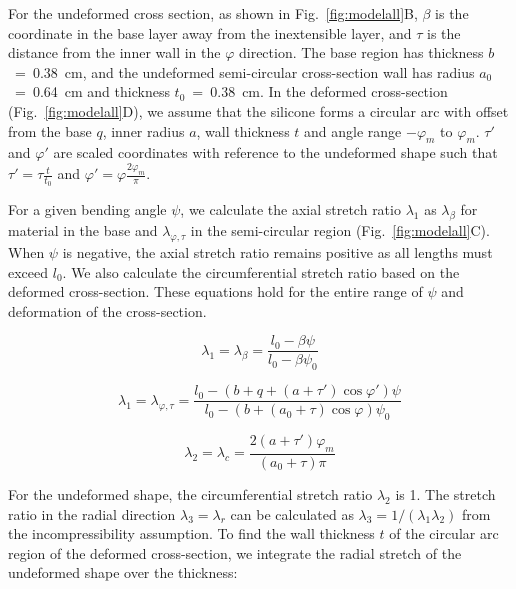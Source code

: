 For the undeformed cross section, as shown in Fig.~\ref{fig:modelall}B, $\beta$ is the coordinate in the base layer away from the inextensible layer, and $\tau$ is the distance from the inner wall in the $\varphi$ direction. The base region has thickness $b$~=~0.38~cm, and the undeformed semi-circular cross-section wall has radius $a_0$~=~0.64~cm and thickness $t_0$~=~0.38~cm. In the deformed cross-section (Fig.~\ref{fig:modelall}D), we assume that the silicone forms a circular arc with offset from the base $q$, inner radius $a$, wall thickness $t$ and angle range $-\varphi_m$ to $\varphi_m$. $\tau'$ and $\varphi'$ are scaled coordinates with reference to the undeformed shape such that $\tau'=\tau\frac{t}{t_0}$ and $\varphi'=\varphi\frac{2\varphi_m}{\pi}$.

For a given bending angle $\psi$, we calculate the axial stretch ratio $\lambda_1$ as $\lambda_{\beta}$ for material in the base and $\lambda_{\varphi,\tau}$ in the semi-circular region (Fig.~\ref{fig:modelall}C). When $\psi$ is negative, the axial stretch ratio remains positive as all lengths must exceed $l_0$. We also calculate the circumferential stretch ratio based on the deformed cross-section. These equations hold for the entire range of $\psi$ and deformation of the cross-section. 

\begin{equation}
    \lambda_1=\lambda_{\beta} = \frac{l_{0} - \beta \psi}{l_{0}-\beta\psi_0} 
    \label{eq:stretchbeta}
\end{equation}

\begin{equation}
    \lambda_1=\lambda_{\varphi,\tau} = \frac{l_{0} - (b+q+(a+\tau')\cos\varphi')\psi}{l_{0} - (b+(a_0+\tau)\cos\varphi)\psi_{0}}
    \label{eq:stretchphitau}
\end{equation}

\begin{equation}
    \lambda_2=\lambda_c = \frac{2(a+\tau')\varphi_m}{(a_0+\tau)\pi} 
    \label{eq:stretchc}
\end{equation}

For the undeformed shape, the circumferential stretch ratio $\lambda_2$ is 1. The stretch ratio in the radial direction $\lambda_3=\lambda_r$ can be calculated as $\lambda_3=1/(\lambda_1 \lambda_2)$ from the incompressibility assumption. To find the wall thickness $t$ of the circular arc region of the deformed cross-section, we integrate the radial stretch of the undeformed shape over the thickness:

